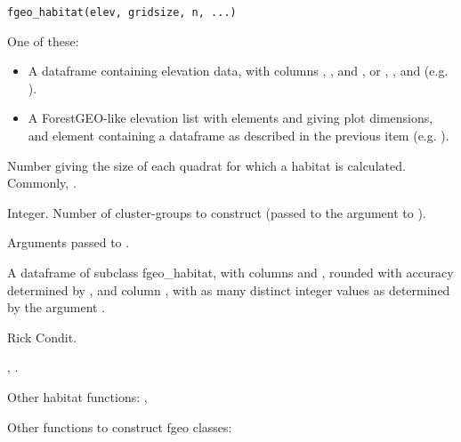 \documentclass[a4paper]{book}
\begin{document}
%
\begin{Usage}
\begin{verbatim}
fgeo_habitat(elev, gridsize, n, ...)
\end{verbatim}
\end{Usage}
%
\begin{Arguments}
\begin{ldescription}
\item[\code{elev}] One of these:
\begin{itemize}

\item A dataframe containing elevation data, with columns , , and
, or , , and  (e.g. ).
\item A ForestGEO-like elevation list with elements  and  giving
plot dimensions, and element  containing a dataframe as described in
the previous item (e.g. ).

\end{itemize}


\item[\code{gridsize}] Number giving the size of each quadrat for which a habitat
is calculated. Commonly, .

\item[\code{n}] Integer. Number of cluster-groups to construct (passed to the
argument  to ).

\item[\code{...}] Arguments passed to .
\end{ldescription}
\end{Arguments}
%
\begin{Value}
A dataframe of subclass fgeo\_habitat, with columns  and ,
rounded with accuracy determined by , and column , with
as many distinct integer values as determined by the argument .
\end{Value}
%
\begin{Author}\relax
Rick Condit.
\end{Author}
%
\begin{SeeAlso}\relax
{}, .

Other habitat functions: ,

Other functions to construct fgeo classes: 
\end{SeeAlso}
\end{document}
